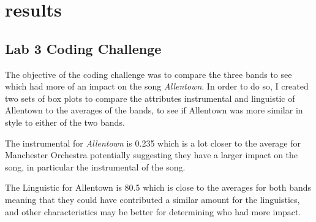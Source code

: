 \documentclass{article}\usepackage[]{graphicx}\usepackage[]{xcolor}
\begin{document}
\section{results}

\subsection{Lab 3 Coding Challenge}
The objective of the coding challenge was to compare the three bands to see which had more of an impact on the song \emph{Allentown}. In order to do so, I created two sets of box plots to compare the attributes instrumental and linguistic of Allentown to the averages of the bands, to see if Allentown was more similar in style to either of the two bands.


The instrumental for \emph{Allentown} is 0.235 which is a lot closer to the average for Manchester Orchestra potentially suggesting they have a larger impact on the song, in particular the instrumental of the song.

The Linguistic for Allentown is 80.5 which is close to the averages for both bands meaning that they could have contributed a similar amount for the linguistics, and other characteristics may be better for determining who had more impact.
\end{document}
